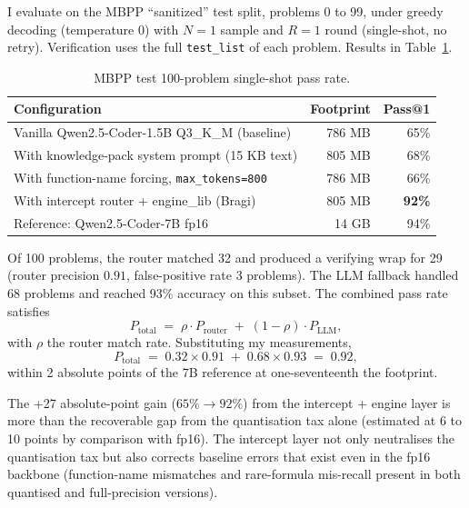 \documentclass[11pt,a4paper]{article}
\begin{document}
I evaluate on the MBPP ``sanitized'' test split, problems 0 to 99, under greedy decoding (temperature 0) with $N=1$ sample and $R=1$ round (single-shot, no retry). Verification uses the full \texttt{test\_list} of each problem. Results in Table~\ref{tab:results}.

\begin{table}[h]
\centering
\caption{MBPP test 100-problem single-shot pass rate.}
\label{tab:results}
\begin{tabular}{lrr}
\toprule
Configuration & Footprint & Pass@1 \\
\midrule
Vanilla Qwen2.5-Coder-1.5B Q3\_K\_M (baseline) & 786 MB & 65\% \\
With knowledge-pack system prompt (15 KB text) & 805 MB & 68\% \\
With function-name forcing, \texttt{max\_tokens=800} & 786 MB & 66\% \\
With intercept router + engine\_lib (Bragi) & 805 MB & \textbf{92\%} \\
Reference: Qwen2.5-Coder-7B fp16 & 14 GB & 94\% \\
\bottomrule
\end{tabular}
\end{table}

Of 100 problems, the router matched 32 and produced a verifying wrap for 29 (router precision $0.91$, false-positive rate 3 problems). The LLM fallback handled 68 problems and reached 93\% accuracy on this subset. The combined pass rate satisfies
\begin{equation}
P_{\text{total}} \;=\; \rho \cdot P_{\text{router}} \;+\; (1 - \rho) \cdot P_{\text{LLM}},
\label{eq:decomp}
\end{equation}
with $\rho$ the router match rate. Substituting my measurements,
\begin{equation}
P_{\text{total}} \;=\; 0.32 \times 0.91 \;+\; 0.68 \times 0.93 \;=\; 0.92,
\label{eq:numbers}
\end{equation}
within 2 absolute points of the 7B reference at one-seventeenth the footprint.

The +27 absolute-point gain ($65\% \to 92\%$) from the intercept + engine layer is more than the recoverable gap from the quantisation tax alone (estimated at 6 to 10 points by comparison with fp16). The intercept layer not only neutralises the quantisation tax but also corrects baseline errors that exist even in the fp16 backbone (function-name mismatches and rare-formula mis-recall present in both quantised and full-precision versions).
\end{document}
